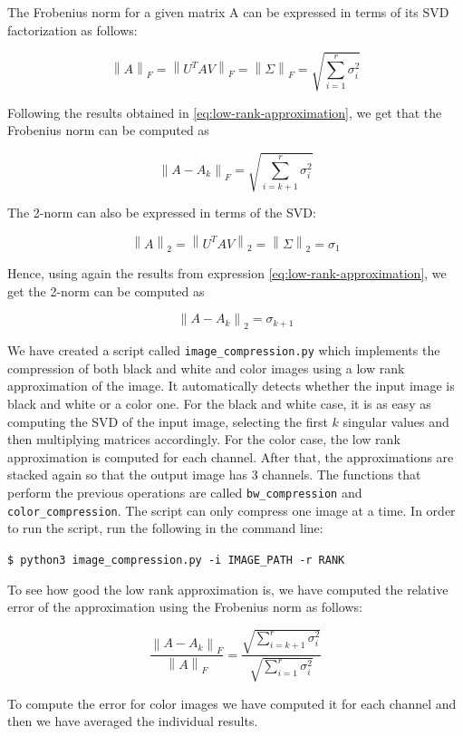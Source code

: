 \documentclass[11pt,a4paper]{article}
\begin{document}
The Frobenius norm for a given matrix A can be expressed in terms of its SVD factorization as follows:

\[
  \left\lVert A \right\rVert_F =
  \left\lVert U^T A V \right\rVert_F =
  \left\lVert \Sigma \right\rVert_F =
  \sqrt{\sum_{i=1}^r \sigma_i^2}
\]

Following the results obtained in \eqref{eq:low-rank-approximation}, we get that the Frobenius norm
can be computed as

\[
  \left\lVert A - A_k \right\rVert_F = \sqrt{\sum_{i=k+1}^r \sigma_i^2}
\]

The 2-norm can also be expressed in terms of the SVD:

\[
  \left\lVert A \right\rVert_2 =
  \left\lVert U^T A V \right\rVert_2 =
  \left\lVert \Sigma \right\rVert_2 = \sigma_1
\]

Hence, using again the results from expression \eqref{eq:low-rank-approximation}, we get the 2-norm can
be computed as

\[
  \left\lVert A - A_k \right\rVert_2 = \sigma_{k+1}
\]

We have created a script called \texttt{image\_compression.py} which implements the compression of both
black and white and color images using a low rank approximation of the image. It automatically detects
whether the input image is black and white or a color one. For the black and white case, it is as easy
as computing the SVD of the input image, selecting the first $k$ singular values and then multiplying matrices
accordingly. For the color case, the low rank approximation is computed for each channel. After that, the
approximations are stacked again so that the output image has 3 channels. The functions that perform the
previous operations are called \texttt{bw\_compression} and \texttt{color\_compression}. The script can only
compress one image at a time. In order to run the script, run the following in the command line:

\texttt{\$ python3 image\_compression.py -i IMAGE\_PATH -r RANK}

To see how good the low rank approximation is, we have computed the relative error of the approximation
using the Frobenius norm as follows:

\[
  \frac{\left\lVert A - A_k \right\rVert_F}{\left\rVert A \right\rVert_F} =
  \frac{\sqrt{\sum_{i=k+1}^r \sigma_i^2}}{\sqrt{\sum_{i=1}^r \sigma_i^2}}
\]

To compute the error for color images we have computed it for each channel and then we have averaged
the individual results.
\end{document}
